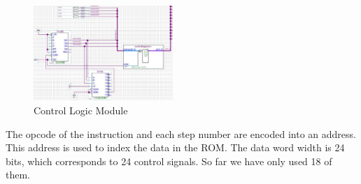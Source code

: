\begin{figure}[th]
	\includegraphics[width=0.47\textwidth]{figures/controllogic}
	\centering
	\caption{Control Logic Module}
	\label{fig:controllogic}
\end{figure}

The opcode of the instruction and each step number are encoded into an address. This address is used to index the data in the ROM. The data word width is 24 bits, which corresponds to 24 control signals. So far we have only used 18 of them.
